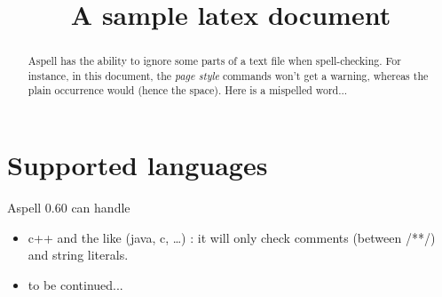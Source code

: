 \documentclass[a4paper,10pt,twoside]{article}
\title{A sample latex document}
\begin{document}
\maketitle

\begin{abstract}
Aspell has the ability to ignore some parts of a text file when spell-checking.
For instance, in this \latex{} document, the \emph{page style} commands won't
get a warning, whereas the plain occurrence would (hence the space).
Here is a mispelled word...
\end{abstract}

\section{Supported languages}
Aspell 0.60 can handle 
\begin{itemize}
\item c++ and the like (java, c, \dots) : it will only check comments (between {\ttfamily /**/})
	  and string literals.
\item to be continued...
\end{itemize}
\end{document}
